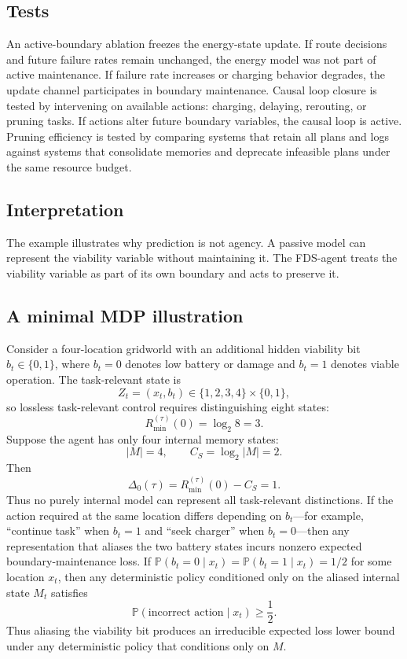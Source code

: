 \documentclass[10pt,a4paper,twocolumn,aps,prl]{revtex4-2}
\newcommand{\Prob}{\mathbb{P}}
\begin{document}
\subsection{Tests}

An active-boundary ablation freezes the energy-state update. If route decisions and future failure rates remain unchanged, the energy model was not part of active maintenance. If failure rate increases or charging behavior degrades, the update channel participates in boundary maintenance. Causal loop closure is tested by intervening on available actions: charging, delaying, rerouting, or pruning tasks. If actions alter future boundary variables, the causal loop is active. Pruning efficiency is tested by comparing systems that retain all plans and logs against systems that consolidate memories and deprecate infeasible plans under the same resource budget.

\subsection{Interpretation}

The example illustrates why prediction is not agency. A passive model can represent the viability variable without maintaining it. The FDS-agent treats the viability variable as part of its own boundary and acts to preserve it.

\subsection{A minimal MDP illustration}

Consider a four-location gridworld with an additional hidden viability bit $b_t\in\{0,1\}$, where $b_t=0$ denotes low battery or damage and $b_t=1$ denotes viable operation. The task-relevant state is
\[
Z_t=(x_t,b_t)\in\{1,2,3,4\}\times\{0,1\},
\]
so lossless task-relevant control requires distinguishing eight states:
\[
R_{\min}^{(\tau)}(0)=\log_2 8=3.
\]
Suppose the agent has only four internal memory states:
\[
|M|=4,\qquad C_S=\log_2|M|=2.
\]
Then
\[
\Delta_0(\tau)=R_{\min}^{(\tau)}(0)-C_S=1.
\]
Thus no purely internal model can represent all task-relevant distinctions. If the action required at the same location differs depending on $b_t$---for example, ``continue task'' when $b_t=1$ and ``seek charger'' when $b_t=0$---then any representation that aliases the two battery states incurs nonzero expected boundary-maintenance loss. If $\Prob(b_t=0\mid x_t)=\Prob(b_t=1\mid x_t)=1/2$ for some location $x_t$, then any deterministic policy conditioned only on the aliased internal state $M_t$ satisfies
\[
\Prob(\text{incorrect action}\mid x_t)\ge\frac12.
\]
Thus aliasing the viability bit produces an irreducible expected loss lower bound under any deterministic policy that conditions only on $M$.
\end{document}

